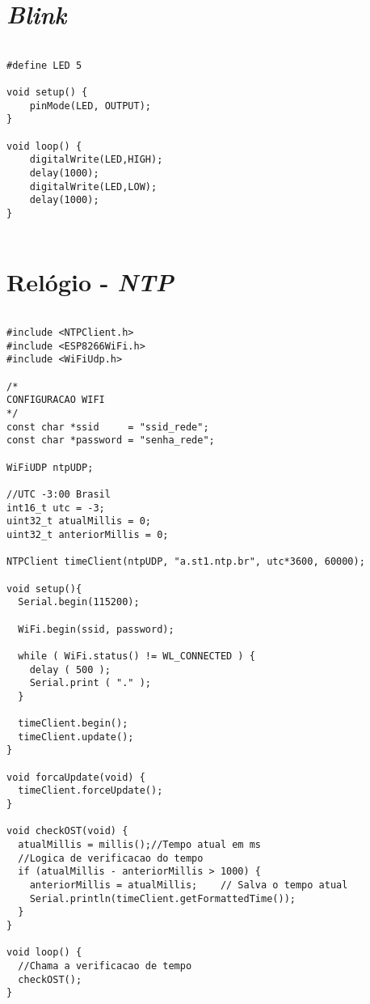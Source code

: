 \documentclass[
	11pt,				%
	openright,			%
	twoside,			%
	a5paper,			%
	english,			%
	french,				%
	spanish,			%
	brazil,				%
	sumario=tradicional
]{abntex2}
\begin{document}
\section{\textit{Blink}}
\begin{lstlisting} 

#define LED 5

void setup() {
    pinMode(LED, OUTPUT);
}

void loop() {
    digitalWrite(LED,HIGH);
    delay(1000);
    digitalWrite(LED,LOW);
    delay(1000);
}


\end{lstlisting}

\newpage

\section{Relógio - \textit{NTP}}

       \begin{lstlisting} 

#include <NTPClient.h>
#include <ESP8266WiFi.h>
#include <WiFiUdp.h>

/*
CONFIGURACAO WIFI
*/
const char *ssid     = "ssid_rede";
const char *password = "senha_rede";

WiFiUDP ntpUDP;

//UTC -3:00 Brasil
int16_t utc = -3; 
uint32_t atualMillis = 0;
uint32_t anteriorMillis = 0;

NTPClient timeClient(ntpUDP, "a.st1.ntp.br", utc*3600, 60000);

void setup(){
  Serial.begin(115200);
  
  WiFi.begin(ssid, password);

  while ( WiFi.status() != WL_CONNECTED ) {
    delay ( 500 );
    Serial.print ( "." );
  }

  timeClient.begin();
  timeClient.update();
}

void forcaUpdate(void) {
  timeClient.forceUpdate();
}

void checkOST(void) {
  atualMillis = millis();//Tempo atual em ms
  //Logica de verificacao do tempo
  if (atualMillis - anteriorMillis > 1000) {
    anteriorMillis = atualMillis;    // Salva o tempo atual
    Serial.println(timeClient.getFormattedTime());
  }
}

void loop() {
  //Chama a verificacao de tempo
  checkOST();
}

\end{lstlisting}

\newpage
\end{document}

